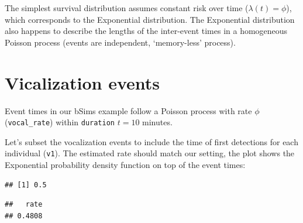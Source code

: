 \documentclass[12pt,]{book}
\newenvironment{Shaded}{\begin{snugshade}}{\end{snugshade}}
\newcommand{\DecValTok}[1]{\textcolor[rgb]{0.00,0.00,0.81}{#1}}
\newcommand{\KeywordTok}[1]{\textcolor[rgb]{0.13,0.29,0.53}{\textbf{#1}}}
\newcommand{\NormalTok}[1]{#1}
\newcommand{\OperatorTok}[1]{\textcolor[rgb]{0.81,0.36,0.00}{\textbf{#1}}}
\newcommand{\StringTok}[1]{\textcolor[rgb]{0.31,0.60,0.02}{#1}}
\begin{document}
The simplest survival distribution assumes constant risk over time (\(\lambda(t)=\phi\)),
which corresponds to the Exponential distribution.
The Exponential distribution also happens to describe the lengths of the
inter-event times in a homogeneous Poisson process (events are independent, `memory-less' process).

\hypertarget{vicalization-events}{%
\section{Vicalization events}\label{vicalization-events}}

Event times in our bSims example follow a Poisson process with rate \(\phi\) (\texttt{vocal\_rate})
within \texttt{duration} \(t=10\) minutes.

Let's subset the vocalization events to include the time of first detections
for each individual (\texttt{v1}). The estimated rate should match our setting,
the plot shows the Exponential probability density function on top of
the event times:

\begin{Shaded}
\end{Shaded}

\begin{verbatim}
## [1] 0.5
\end{verbatim}

\begin{Shaded}
\end{Shaded}

\begin{verbatim}
##   rate 
## 0.4808
\end{verbatim}
\end{document}
